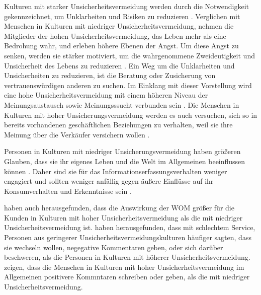 Kulturen mit starker Unsicherheitsvermeidung werden durch die Notwendigkeit gekennzeichnet, um Unklarheiten und Risiken zu reduzieren \citep{kale1992understanding}. Verglichen mit Menschen in Kulturen mit niedriger Unsicherheitsvermeidung, nehmen die Mitglieder der hohen Unsicherheitsvermeidung, das Leben mehr als eine Bedrohung wahr, und erleben höhere Ebenen der Angst. Um diese Angst zu senken, werden sie stärker motiviert, um die wahrgenommene Zweideutigkeit und Unsicherheit des Lebens zu reduzieren \citep{doney1998understanding}. Ein Weg um die Unklarheiten und Unsicherheiten zu reduzieren, ist die Beratung oder Zusicherung von vertrauenswürdigen anderen zu suchen. Im Einklang mit dieser Vorstellung wird eine hohe Unsicherheitsvermeidung mit einem höheren Niveau der Meinungsaustausch sowie Meinungsssucht verbunden sein \citep{Lam2009, liu2001relationships, dawar1996cross, money1998explorations}. Die Menschen in Kulturen mit hoher Unsicherungsvermeidung werden es auch versuchen, sich so in bereits vorhandenen geschäftlichen Beziehungen zu verhalten, weil sie ihre Meinung über die Verkäufer versichern wollen \citep{Schumann2010a}.

Personen in Kulturen mit niedriger Unsicherungsvermeidung haben größeren Glauben, dass sie ihr eigenes Leben und die Welt im Allgemeinen beeinflussen können \citep{hofstede2001culture}. Daher sind sie für das Informationserfassungsverhalten weniger engagiert und sollten weniger anfällig gegen äußere Einflüsse auf ihr Konsumverhalten und Erkenntnisse sein \citep{dawar1996cross, money1998explorations}. 

\citet{Schumann2010a} haben auch herausgefunden, dass die Auswirkung der \ac{WOM} größer für die Kunden in Kulturen mit hoher Unsicherheitsvermeidung als die mit niedriger Unsicherheitsvermeidung ist. \citet{liu2001relationships} haben herausgefunden, dass mit schlechtem Service, Personen aus geringerer Unsicherheitsvermeidungskulturen häufiger sagten, dass sie wechseln wollen, negegative Kommentaren geben, oder sich darüber beschweren, als die Personen in Kulturen mit höherer Unsicherheitsvermeidung. \citet{donthu1998cultural} zeigen, dass die Menschen in Kulturen mit hoher Unsicherheitsvermeidung im Allgemeinen positivere Kommntaren schreiben oder geben, als die mit niedriger Unsicherheitsvermeidung.
